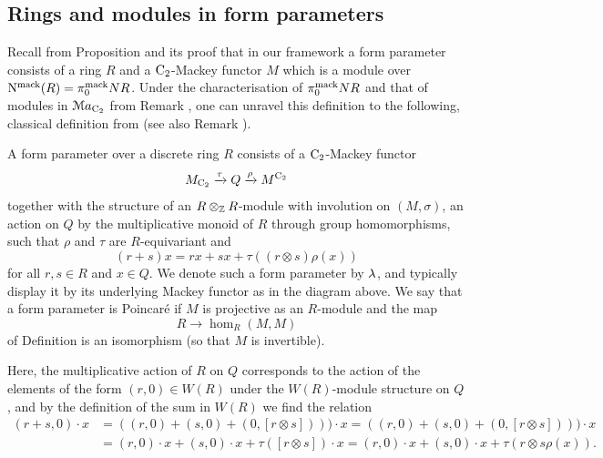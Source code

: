 \subsection{Rings and modules in form parameters}


Recall from Proposition  and its proof that in our framework a form parameter consists of a ring $R$ and a $\mathrm{C_2}$-Mackey functor $M$ which is a module over $\mathrm{N}^{\mathrm{mack}}(R) = \pi^{\mathrm{mack}}_0NR$. %
Under the characterisation of $\pi^{\mathrm{mack}}_0NR$ and that of modules in $\mathcal{M}a_{\mathrm{C_2}}$ from Remark , one can unravel this definition
to the following, classical definition from \cite{SchlichtinghigherI} (see also Remark ).

\begin{definition}
A form parameter over a discrete ring $R$ consists of a $\mathrm{C_2}$-Mackey functor
\[
M_{\mathrm{C_2}}\xrightarrow{\tau}Q\xrightarrow{\rho}M^{\mathrm{C_2}}
\]
together with the structure of an $R\otimes_{\mathbb{Z}} R$-module with involution on $(M,\sigma)$, an action on $Q$ by the multiplicative monoid of $R$ through group homomorphisms, such that $\rho$ and $\tau$ are $R$-equivariant and
\[
(r+s)x=rx+sx+\tau((r\otimes s)\rho(x))
\]
for all $r,s\in R$ and $x\in Q$. We denote such a form parameter by $\lambda$, and typically display it by its underlying Mackey functor as in the diagram above.
We say that a form parameter is Poincar\'e if $M$ is projective as an $R$-module and the map
\[
R\longrightarrow \hom_R(M,M)
\]
of Definition  is an isomorphism (so that $M$ is invertible).
\end{definition}

Here, the multiplicative action of $R$ on $Q$ corresponds to the action of the elements of the form $(r,0)\in W(R)$ under the $W(R)$-module structure on $Q$, and by the definition of the sum in $W(R)$ we find the relation
\begin{align*}
(r+s,0)\cdot x&=((r,0)+(s,0)+(0,[r\otimes s])))\cdot x=((r,0)+(s,0)+(0,[r\otimes s])))\cdot x
\\&=(r,0)\cdot x+(s,0)\cdot x+\tau([r\otimes s])\cdot x=(r,0)\cdot x+(s,0)\cdot x+\tau(r\otimes s\rho(x)).
\end{align*}








